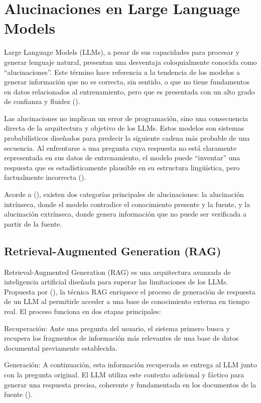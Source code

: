 {{\section{Alucinaciones en Large Language Models}
Large Language Models (LLMs), a pesar de sus capacidades para procesar y generar lenguaje natural, presentan una desventaja coloquialmente conocida como “alucinaciones”. Este término hace referencia a la tendencia de los modelos a generar información que no es correcta, sin sentido, o que no tiene fundamentos en datos relacionados al entrenamiento, pero que es presentada con un alto grado de confianza y fluidez (\cite{Ji2023HallucinationSurvey, Rawte2023LLMHallucinationSurvey}).

Las alucinaciones no implican un error de programación, sino una consecuencia directa de la arquitectura y objetivo de los LLMs. Estos modelos son sistemas probabilísticos diseñados para predecir la siguiente cadena más probable de una secuencia. Al enfrentarse a una pregunta cuya respuesta no está claramente representada en sus datos de entrenamiento, el modelo puede “inventar” una respuesta que es estadísticamente plausible en su estructura lingüística, pero factualmente incorrecta (\cite{Ji2023HallucinationSurvey, Rawte2023LLMHallucinationSurvey}).

Acorde a (\cite{Ji2023HallucinationSurvey}), existen dos categorías principales de alucinaciones: la alucinación intrínseca, donde el modelo contradice el conocimiento presente y la fuente, y la alucinación extrínseca, donde genera información que no puede ser verificada a partir de la fuente.

\subsection{Retrieval-Augmented Generation (RAG)}
Retrieval-Augmented Generation (RAG) es una arquitectura avanzada de inteligencia artificial diseñada para superar las limitaciones de los LLMs. Propuesta por (\cite{lewis2020retrieval}), la técnica RAG enriquece el proceso de generación de respuesta de un LLM al permitirle acceder a una base de conocimiento externa en tiempo real. El proceso funciona en dos etapas principales:

\begin{listaenumerada}
\item Recuperación: Ante una pregunta del usuario, el sistema primero busca y recupera los fragmentos de información más relevantes de una base de datos documental previamente establecida.
\item Generación: A continuación, esta información recuperada se entrega al LLM junto con la pregunta original. El LLM utiliza este contexto adicional y fáctico para generar una respuesta precisa, coherente y fundamentada en los documentos de la fuente (\cite{databricks2023rag, llamaindex2024fine}).


\end{listaenumerada}}}
